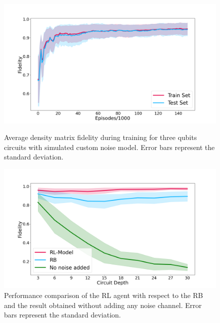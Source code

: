 \documentclass[referee,sn-basic]{sn-jnl} %
\begin{document}
\begin{figure}
    \centering
    \includegraphics[width=\textwidth]{3Q_train_results.png}
    \caption{Average density matrix fidelity during training for three qubits circuits with simulated 
    custom noise model. Error bars represent the standard deviation.}\label{fig_3q_sim_train}
    \includegraphics[width=\textwidth]{3Q_rb.png}
    \caption{Performance comparison of the RL agent with respect to the RB and the result obtained 
    without adding any noise channel. Error bars represent the standard deviation.}\label{fig_3q_sim_bench}
\end{figure}
\end{document}
